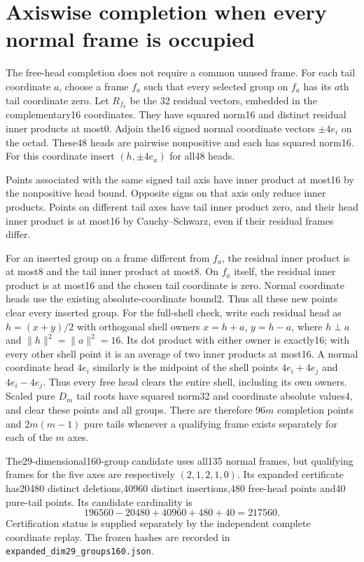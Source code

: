 \section*{Axiswise completion when every normal frame is occupied}
The free-head completion does not require a common unused frame.
For each tail coordinate $a$, choose a frame $f_a$ such that every selected
group on $f_a$ has its $a$th tail coordinate zero.  Let $R_{f_a}$ be the
32 residual vectors, embedded in the complementary16 coordinates.  They
have squared norm16 and distinct residual inner products at most0.
Adjoin the16 signed normal coordinate vectors $\pm4e_i$ on the octad.
These48 heads are pairwise nonpositive and each has squared norm16.
For this coordinate insert $(h,\pm4e_a)$ for all48 heads.

Points associated with the same signed tail axis have inner product
at most16 by the nonpositive head bound.  Opposite signs on that axis
only reduce inner products.  Points on different tail axes have tail
inner product zero, and their head inner product is at most16 by
Cauchy--Schwarz, even if their residual frames differ.

For an inserted group on a frame different from $f_a$, the residual
inner product is at most8 and the tail inner product at most8.  On
$f_a$ itself, the residual inner product is at most16 and the chosen
tail coordinate is zero.  Normal coordinate heads use the existing
absolute-coordinate bound2.  Thus all these new points clear every
inserted group.  For the full-shell check, write each residual head as $h=(x+y)/2$
with orthogonal shell owners $x=h+a$, $y=h-a$, where $h\perp a$
and $\|h\|^2=\|a\|^2=16$.  Its dot product with either owner
is exactly16; with every other shell point it is an average of two
inner products at most16.  A normal coordinate head $4e_i$ similarly
is the midpoint of the shell points $4e_i+4e_j$ and $4e_i-4e_j$.
Thus every free head clears the entire shell, including its own owners.  Scaled pure $D_m$ tail roots have squared norm32 and
coordinate absolute values4, and clear these points and all groups.
There are therefore $96m$ completion points and $2m(m-1)$ pure tails
whenever a qualifying frame exists separately for each of the $m$ axes.

The29-dimensional160-group candidate uses all135 normal frames, but
qualifying frames for the five axes are respectively $(2,1,2,1,0)$.
Its expanded certificate has20480 distinct deletions,40960 distinct
insertions,480 free-head points and40 pure-tail points.  Its candidate
cardinality is
\[
196560-20480+40960+480+40=217560.
\]
Certification status is supplied separately by the independent complete
coordinate replay.  The frozen hashes are recorded in
\texttt{expanded\_dim29\_groups160.json}.
